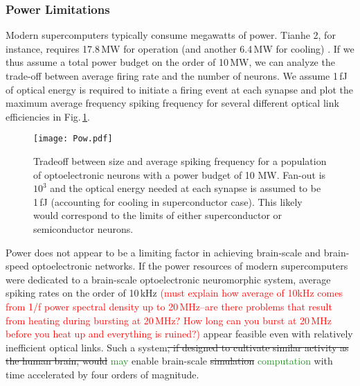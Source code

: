 \documentclass[twocolumn]{article}
\begin{document}
\subsubsection{Power Limitations}
Modern supercomputers typically consume megawatts of power. Tianhe 2, for instance, requires 17.8\,MW for operation (and another 6.4\,MW for cooling) \cite{tolpygo2016superconductor}. If we thus assume a total power budget on the order of 10\,MW, we can analyze the trade-off between average firing rate and the number of neurons. We assume 1\,fJ of optical energy is required to initiate a firing event at each synapse and plot the maximum average frequency spiking frequency for several different optical link efficiencies in Fig.\,\ref{fig:freq_size}.
\begin{figure}[h!]
    \centering
    \texttt{[image: Pow.pdf]}
    \caption{Tradeoff between size and average spiking frequency for a population of optoelectronic neurons with a power budget of 10 MW. Fan-out is $10^3$ and the optical energy needed at each synapse is assumed to be 1\,fJ (accounting for cooling in superconductor case). This likely would correspond to the limits of either superconductor or semiconductor neurons.}
    \label{fig:freq_size}
\end{figure}

Power does not appear to be a limiting factor in achieving brain-scale and brain-speed optoelectronic networks. If the power resources of modern supercomputers were dedicated to a brain-scale optoelectronic neuromorphic system, average spiking rates on the order of 10\,kHz \textcolor{red}{(must explain how average of 10kHz comes from 1/f power spectral density up to 20\,MHz--are there problems that result from heating during bursting at 20\,MHz? How long can you burst at 20\,MHz before you heat up and everything is ruined?)} appear feasible even with relatively inefficient optical links. Such a system\sout{, if designed to cultivate similar activity as the human brain, would} \textcolor{ForestGreen}{may} enable brain-scale \sout{simulation} \textcolor{ForestGreen}{computation} with time accelerated by four orders of magnitude.
\end{document}
